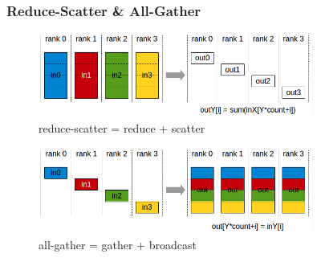 \documentclass{beamer}
\begin{document}
\begin{frame}[fragile]
\frametitle{Reduce-Scatter \& All-Gather}

\begin{figure}[h]
    \centering
    \includegraphics[width=0.8\textwidth]{reducescatter.png}
    \captionsetup{labelformat=empty}
    \caption{reduce-scatter = reduce + scatter}
\end{figure}

\begin{figure}[h]
    \centering
    \includegraphics[width=0.8\textwidth]{allgather.png}
    \captionsetup{labelformat=empty}
    \caption{all-gather = gather + broadcast}
\end{figure}

\end{frame}
\end{document}
